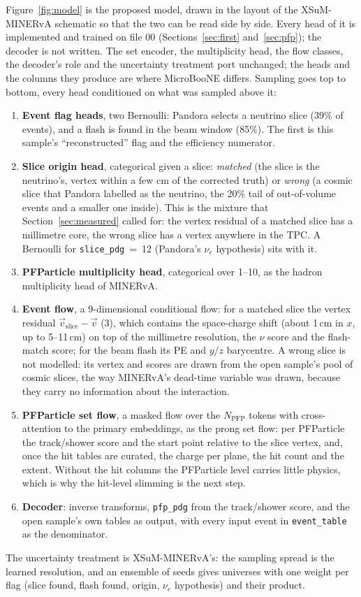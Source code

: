 \documentclass[10pt,letterpaper]{article}
\newcommand{\code}[1]{\texttt{#1}}
\newcommand{\pct}[1]{#1\%}
\begin{document}
Figure~\ref{fig:model} is the proposed model, drawn in the layout of the XSuM-MINERvA schematic so that the two can be
read side by side. Every head of it is implemented and trained on file 00 (Sections~\ref{sec:first}
and~\ref{sec:pfp}); the decoder is not written. The set encoder, the multiplicity head, the flow
classes, the decoder's role and the uncertainty treatment port unchanged; the heads and the columns they produce are
where MicroBooNE differs. Sampling goes top to bottom, every head conditioned on what was sampled above it:
\begin{enumerate}[nosep]
\item \textbf{Event flag heads}, two Bernoulli: Pandora selects a neutrino slice (\pct{39} of events), and a flash is
  found in the beam window (\pct{85}). The first is this sample's ``reconstructed'' flag and the efficiency numerator.
\item \textbf{Slice origin head}, categorical given a slice: \emph{matched} (the slice is the neutrino's, vertex within
  a few cm of the corrected truth) or \emph{wrong} (a cosmic slice that Pandora labelled as the neutrino, the \pct{20} tail of
  out-of-volume events and a smaller one inside). This is the mixture that Section~\ref{sec:measured} called for: the
  vertex residual of a matched slice has a millimetre core, the wrong slice has a vertex anywhere in the TPC. A
  Bernoulli for \code{slice\_pdg}~=~12 (Pandora's $\nu_e$ hypothesis) sits with it.
\item \textbf{PFParticle multiplicity head}, categorical over 1--10, as the hadron multiplicity head of MINERvA.
\item \textbf{Event flow}, a 9-dimensional conditional flow: for a matched slice the vertex residual
  $\vec v_\text{slice}-\vec v$ (3), which contains the space-charge shift (about 1\,cm in $x$, up to 5--11\,cm) on top
  of the millimetre resolution, the $\nu$ score and the flash-match score; for the beam flash its PE and $y$/$z$ barycentre. A wrong slice is not
  modelled: its vertex and scores are drawn from the open sample's pool of cosmic slices, the way MINERvA's dead-time
  variable was drawn, because they carry no information about the interaction.
\item \textbf{PFParticle set flow}, a masked flow over the $N_\text{PFP}$ tokens with cross-attention to the primary
  embeddings, as the prong set flow: per PFParticle the track/shower score and the start point relative to the slice
  vertex, and, once the hit tables are curated, the charge per plane, the hit count and the extent. Without the hit
  columns the PFParticle level carries little physics, which is why the hit-level slimming is the next step.
\item \textbf{Decoder}: inverse transforms, \code{pfp\_pdg} from the track/shower score, and the open sample's own
  tables as output, with every input event in \code{event\_table} as the denominator.
\end{enumerate}
The uncertainty treatment is XSuM-MINERvA's: the sampling spread is the learned resolution, and an ensemble of seeds
gives universes with one weight per flag (slice found, flash found, origin, $\nu_e$ hypothesis) and their product.
\end{document}
